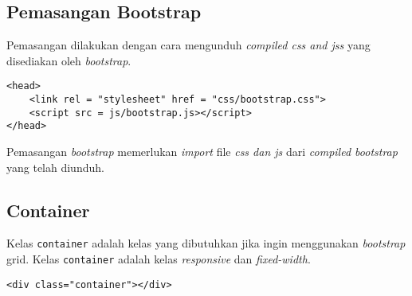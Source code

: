 \begin{table}[H]
	\centering
	\caption{\textit{Browser Desktop} yang mendukung \textit{bootstrap}}
\label{tab:bootstrap desktop supported}
\end{table}






\subsection{Pemasangan Bootstrap}
Pemasangan dilakukan dengan cara mengunduh \textit{compiled css and jss} yang disediakan oleh \textit{bootstrap}.

\begin{lstlisting}
<head>
	<link rel = "stylesheet" href = "css/bootstrap.css">
	<script src = js/bootstrap.js></script>
</head>
\end{lstlisting}

Pemasangan \textit{bootstrap} memerlukan \textit{import} file \textit{css dan js} dari \textit{compiled bootstrap} yang telah diunduh.

\subsection{Container}
Kelas \texttt{container} adalah kelas yang dibutuhkan jika ingin menggunakan \textit{bootstrap} grid. Kelas \texttt{container} adalah kelas \textit{responsive} dan \textit{fixed-width}.
\begin{lstlisting}
<div class="container"></div>
\end{lstlisting}

